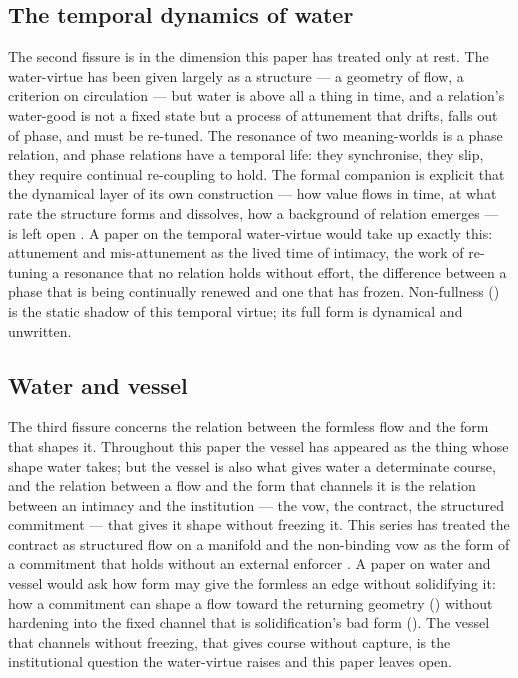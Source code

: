 \subsection{The temporal dynamics of water}
\label{p20:sub:fissure-time}

The second fissure is in the dimension this paper has treated only at rest. The water-virtue has been given largely as a structure --- a geometry of flow, a criterion on circulation --- but water is above all a thing in time, and a relation's water-good is not a fixed state but a process of attunement that drifts, falls out of phase, and must be re-tuned. The resonance of two meaning-worlds \parencite{paperxix} is a phase relation, and phase relations have a temporal life: they synchronise, they slip, they require continual re-coupling to hold. The formal companion is explicit that the dynamical layer of its own construction --- how value flows in time, at what rate the structure forms and dissolves, how a background of relation emerges --- is left open \parencite{wan2026braid}. A paper on the temporal water-virtue would take up exactly this: attunement and mis-attunement as the lived time of intimacy, the work of re-tuning a resonance that no relation holds without effort, the difference between a phase that is being continually renewed and one that has frozen. Non-fullness () is the static shadow of this temporal virtue; its full form is dynamical and unwritten.

\subsection{Water and vessel}
\label{p20:sub:fissure-vessel}

The third fissure concerns the relation between the formless flow and the form that shapes it. Throughout this paper the vessel has appeared as the thing whose shape water takes; but the vessel is also what gives water a determinate course, and the relation between a flow and the form that channels it is the relation between an intimacy and the institution --- the vow, the contract, the structured commitment --- that gives it shape without freezing it. This series has treated the contract as structured flow on a manifold and the non-binding vow as the form of a commitment that holds without an external enforcer \parencite{paperxiii,paperxix}. A paper on water and vessel would ask how form may give the formless an edge without solidifying it: how a commitment can shape a flow toward the returning geometry () without hardening into the fixed channel that is solidification's bad form (). The vessel that channels without freezing, that gives course without capture, is the institutional question the water-virtue raises and this paper leaves open.

